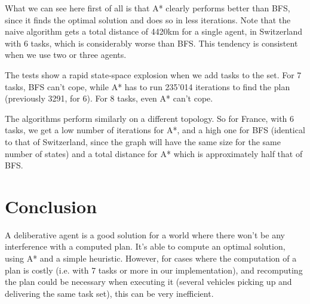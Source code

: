 \documentclass[12pt,a4paper]{article}
\begin{document}
What we can see here first of all is that A* clearly performs better than BFS, since it finds the optimal solution and does so in less iterations. Note that the naive algorithm gets a total distance of 4420km for a single agent, in Switzerland with 6 tasks, which is considerably worse than BFS. This tendency is consistent when we use two or three agents.

The tests show a rapid state-space explosion when we add tasks to the set. For 7 tasks, BFS can't cope, while A* has to run 235'014 iterations to find the plan (previously 3291, for 6). For 8 tasks, even A* can't cope. 

The algorithms perform similarly on a different topology. So for France, with 6 tasks, we get a low number of iterations for A*, and a high one for BFS (identical to that of Switzerland, since the graph will have the same size for the same number of states) and a total distance for A* which is approximately half that of BFS.

\section{Conclusion}
A deliberative agent is a good solution for a world where there won't be any interference with a computed plan. It's able to compute an optimal solution, using A* and a simple heuristic. However, for cases where the computation of a plan is costly (i.e. with 7 tasks or more in our implementation), and recomputing the plan could be necessary when executing it (several vehicles picking up and delivering the same task set), this can be very inefficient. 
\end{document}
